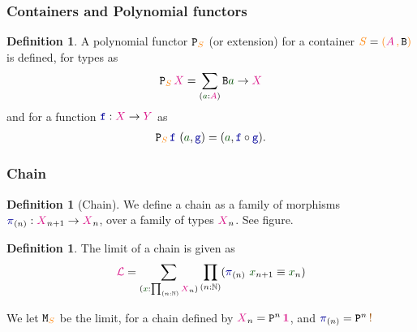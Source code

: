 \documentclass[xelatex,mathserif,serif,notheorems]{beamer} %
\theoremstyle{plain} %
\theoremstyle{definition}
\newtheorem{defn}[thm]{Definition}%
\theoremstyle{remark}
\newcommand*{\term}[1]{\textcolor{green!30!black}{#1}} %
\newcommand*{\type}[1]{\textcolor{magenta!90!black}{#1}}
\newcommand*{\container}[1]{\textcolor{orange}{#1}}
\newcommand*{\containerpair}[2]{\ensuremath{\colorlet{savedleftcolor}{.}\color{orange}\left(\color{savedleftcolor}#1\,\textcolor{orange}{\mathbf{,}}\,#2\color{orange}\right)\color{savedleftcolor}}}
\newcommand*{\unit}{\type{\textbf{1}}}
\newcommand*{\constant}[1]{\textcolor{orange!60!black}{\ensuremath{\mathtt{#1}}}}
\newcommand*{\function}[1]{\textcolor{blue!60!black}{\ensuremath{\mathtt{#1}}}}
\newcommand*{\typeformer}[1]{\ensuremath{\mathtt{#1}}}
\newcommand*{\functor}[1]{\ensuremath{\mathbf{\mathtt{#1}}}}
\newcommand{\setlengths}{
  \setlength{\abovedisplayskip}{4pt}
  \setlength{\belowdisplayskip}{4pt}
  \setlength{\abovedisplayshortskip}{2pt}
  \setlength{\belowdisplayshortskip}{2pt}
}
\begin{document}
\begin{frame}[fragile]
  \frametitle{Containers and Polynomial functors}
  \begin{defn}\setlengths
    A polynomial functor \(\functor{P}_{\container{S}}\) (or extension) for a container \(\container{S} = \containerpair{\type{A}}{\typeformer{B}}\) is defined, for types as
    \begin{equation}
      \functor{P}_{\container{S}}\,\type{X} = \sum_{(\term{a} : \type{A})} \typeformer{B}\term{a} \rightarrow \type{X}
    \end{equation}
    and for a function \(\function{f} : \type{X} \rightarrow \type{Y}\) as
    \begin{equation}
      \begin{aligned}
        \functor{P}_{\container{S}}\,\function{f}~(\term{a},\function{g}) = (\term{a}, \function{f} \circ \function{g}).
      \end{aligned}
    \end{equation}
  \end{defn}
\end{frame}

\begin{frame}[fragile]
  \frametitle{Chain}
  \begin{defn}[Chain]\setlengths
    We define a chain as a family of morphisms \(\function{\pi}_{(n)} : \type{X}_{n+1} \rightarrow \type{X}_{n}\), over a family of types \(\type{X}_{n}\). See figure.
  \end{defn}
  \begin{figure}[h]
    \centering
  \end{figure}
  \begin{defn}\setlengths
    The limit of a chain is given as
    \begin{equation}
      \type{\mathcal{L}} = \sum_{(\term{x} : \prod_{(n : \mathbb{N})} \type{X}_n)} \prod_{(n : \mathbb{N})} (\function{\pi}_{(n)}~\term{x}_{n+1} \equiv \term{x}_n)
    \end{equation}
  \end{defn}
  We let \(\typeformer{M}_{\container{S}}\) be the limit, for a chain defined by \(\type{X}_n = \functor{P}^n\,\unit\), and \(\function{\pi}_{(n)} = \functor{P}^n\,\constant{!}\)
\end{frame}
\end{document}
